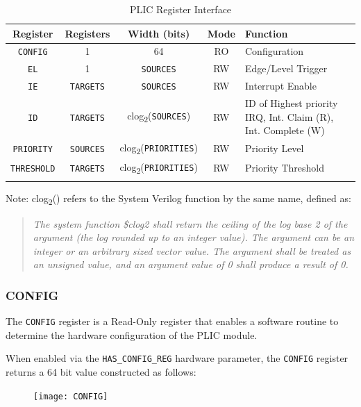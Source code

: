 \begin{longtable}[c]{@{\extracolsep{\fill}}ccccp{5cm}@{\extracolsep{\fill}}}	
	\toprule 
	\textbf{Register} & \textbf{Registers} & \textbf{Width (bits)} & \textbf{Mode} & \textbf{Function} \\
	\midrule 
	\endhead
	\texttt{CONFIG} & 1 & 64 & RO & Configuration\\
	\texttt{EL} & 1 & \texttt{SOURCES} & RW & Edge/Level Trigger\\
	\texttt{IE} & \texttt{TARGETS} & \texttt{SOURCES} & RW & Interrupt Enable\\
	\texttt{ID} & \texttt{TARGETS} & clog\textsubscript{2}(\texttt{SOURCES}) & RW & ID of Highest priority IRQ, \newline Int. Claim (R), \newline Int. Complete (W)\\
	\texttt{PRIORITY} & \texttt{SOURCES} & clog\textsubscript{2}(\texttt{PRIORITIES}) & RW & Priority Level\\
	\texttt{THRESHOLD} & \texttt{TARGETS} & clog\textsubscript{2}(\texttt{PRIORITIES}) & RW & Priority Threshold \\
	\bottomrule 	

\caption{PLIC Register Interface}
\label{tab:REGIF2}
\end{longtable}

Note: clog\textsubscript{2}() refers to the System Verilog function by
the same name, defined as:

\begin{quote}
\emph{The system function \$clog2 shall return the ceiling of the log
base 2 of the argument (the log rounded up to an integer value). The
argument can be an integer or an arbitrary sized vector value. The
argument shall be treated as an unsigned value, and an argument value of
0 shall produce a result of 0.}
\end{quote}

\subsubsection{CONFIG}

The \texttt{CONFIG} register is a Read-Only register that enables a
software routine to determine the hardware configuration of the PLIC
module.

When enabled via the \texttt{HAS\_CONFIG\_REG} hardware parameter, the
\texttt{CONFIG} register returns a 64 bit value constructed as follows:

\begin{figure}[h]
	\texttt{[image: CONFIG]}
	\caption[Configuration Register]{}
	\label{fig:configreg}
\end{figure}



